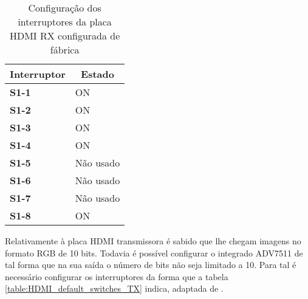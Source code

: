 \begin{table}[h!]
	\centering

		\begin{tabular}{@{}ll@{}}
			\toprule
			\multicolumn{1}{c}{\textbf{Interruptor}} & \multicolumn{1}{c}{\textbf{Estado}} \\ \midrule
			\textbf{S1-1}                            & ON                                  \\
			\textbf{S1-2}                            & ON                                  \\
			\textbf{S1-3}                            & ON                                  \\
			\textbf{S1-4}                            & ON                                  \\
			\textbf{S1-5}                            & Não usado                           \\
			\textbf{S1-6}                            & Não usado                           \\
			\textbf{S1-7}                            & Não usado                           \\
			\textbf{S1-8}                            & ON                                  \\ \bottomrule
		\end{tabular}%
	\captionsetup{width=0.3\linewidth}
	\caption{Configuração dos interruptores da placa HDMI RX configurada de fábrica}
	\label{table:HDMI_default_switches_RX}
\end{table}

Relativamente à placa HDMI transmissora é sabido que lhe chegam imagens no formato RGB de 10 bits. Todavia é possível configurar o integrado ADV7511 de tal forma que na sua saída o número de bits não seja limitado a 10. Para tal é necessário configurar os interruptores da forma que a tabela \ref{table:HDMI_default_switches_TX} indica, adaptada de \cite{R009}.

